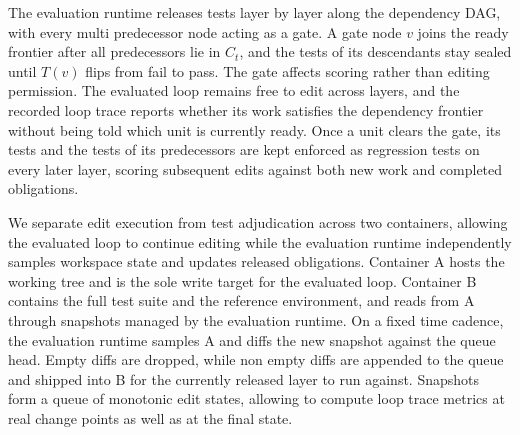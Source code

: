 The evaluation runtime releases tests layer by layer along the dependency DAG, with every multi predecessor node acting as a gate.
A gate node $v$ joins the ready frontier after all predecessors lie in $C_t$, and the tests of its descendants stay sealed until $T(v)$ flips from fail to pass.
The gate affects scoring rather than editing permission. The evaluated loop remains free to edit across layers, and the recorded loop trace reports whether its work satisfies the dependency frontier without being told which unit is currently ready.
Once a unit clears the gate, its tests and the tests of its predecessors are kept enforced as regression tests on every later layer, scoring subsequent edits against both new work and completed obligations.

We separate edit execution from test adjudication across two containers, allowing the evaluated loop to continue editing while the evaluation runtime independently samples workspace state and updates released obligations.
Container A hosts the working tree and is the sole write target for the evaluated loop.
Container B contains the full test suite and the reference environment, and reads from A through snapshots managed by the evaluation runtime.
On a fixed time cadence, the evaluation runtime samples A and diffs the new snapshot against the queue head. Empty diffs are dropped, while non empty diffs are appended to the queue and shipped into B for the currently released layer to run against.
Snapshots form a queue of monotonic edit states, allowing \lhb{} to compute loop trace metrics at real change points as well as at the final state.
